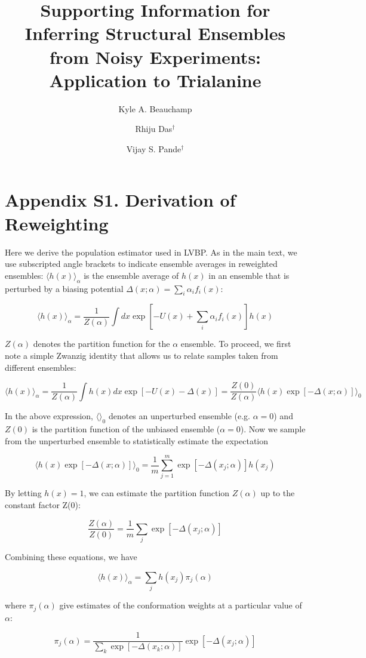 \documentclass[journal=jacsat,manuscript=article]{achemso}
\author{Kyle A. Beauchamp}
\affiliation[Biophysics Program]{Biophysics Program}
\author{Rhiju Das$^\dagger$}
\affiliation[Biochemistry Department]{Biochemistry Department, Stanford University, Stanford, CA}
\author{Vijay S. Pande$^\dagger$}
\affiliation[Chemistry Department]{Chemistry Department, Stanford University, Stanford, CA}
\title{Supporting Information for Inferring Structural Ensembles from Noisy Experiments: Application to Trialanine}
\begin{document}
\maketitle

\newpage

\section{Appendix S1.  Derivation of Reweighting}

Here we derive the population estimator used in LVBP.  As in the main text, we use subscripted angle brackets to indicate ensemble averages in reweighted ensembles: $\langle h(x)\rangle _\alpha$ is the ensemble average of $h(x)$ in an ensemble that is perturbed by a biasing potential $\Delta (x;\alpha) = \sum_i \alpha_i f_i(x)$:

$$\langle h(x)\rangle _\alpha = \frac{1}{Z(\alpha)} \int dx \exp[-U(x) + \sum_i \alpha_i f_i(x)] h(x)$$

$Z(\alpha)$ denotes the partition function for the $\alpha$ ensemble.  To proceed, we first note a simple Zwanzig identity that allows us to relate samples taken from different ensembles:

$$\langle h(x)\rangle _\alpha = \frac{1}{Z(\alpha)} \int h(x) dx \exp[ -U(x) - \Delta(x)] = \frac{Z(0)}{Z(\alpha)} \langle h(x) \exp[-\Delta(x;\alpha)]\rangle _0 $$

In the above expression, $\langle \rangle_0$ denotes an unperturbed ensemble (e.g. $\alpha = 0$) and $Z(0)$ is the partition function of the unbiased ensemble ($\alpha = 0$).  Now we sample from the unperturbed ensemble to statistically estimate the expectation

$$\langle h(x) \exp[-\Delta(x;\alpha)]\rangle _0 = \frac{1}{m} \sum_{j = 1}^{m} \exp [ - \Delta(x_j;\alpha)] h(x_j)$$

By letting $h(x) = 1$, we can estimate the partition function $Z(\alpha)$ up to the constant factor Z(0):

$$ \frac{Z(\alpha)}{Z(0)} = \frac{1}{m} \sum_j \exp[-\Delta(x_j;\alpha)]$$

Combining these equations, we have

$$\langle h(x)\rangle _\alpha = \sum_j h(x_j) \pi_j(\alpha)$$

where $\pi_j(\alpha)$ give estimates of the conformation weights at a particular value of $\alpha$:

$$\pi_j(\alpha) = \frac{1}{\sum_k \exp[-\Delta(x_k;\alpha)]} \exp[-\Delta(x_j;\alpha)]$$
\end{document}
